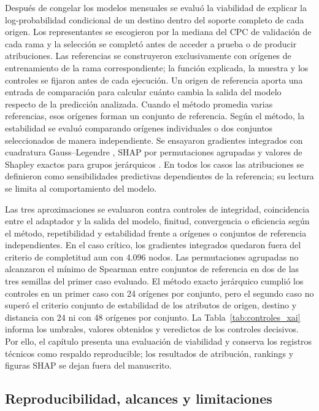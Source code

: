 Después de congelar los modelos mensuales se evaluó la viabilidad de explicar la log-probabilidad condicional de un destino dentro del soporte completo de cada origen. Los representantes se escogieron por la mediana del CPC de validación de cada rama y la selección se completó antes de acceder a prueba o de producir atribuciones. Las referencias se construyeron exclusivamente con orígenes de entrenamiento de la rama correspondiente; la función explicada, la muestra y los controles se fijaron antes de cada ejecución. Un origen de referencia aporta una entrada de comparación para calcular cuánto cambia la salida del modelo respecto de la predicción analizada. Cuando el método promedia varias referencias, esos orígenes forman un conjunto de referencia. Según el método, la estabilidad se evaluó comparando orígenes individuales o dos conjuntos seleccionados de manera independiente. Se ensayaron gradientes integrados con cuadratura Gauss--Legendre \cite{sundararajan2017axiomatic}, SHAP por permutaciones agrupadas y valores de Shapley exactos para grupos jerárquicos \cite{lundberg2017shap}. En todos los casos las atribuciones se definieron como sensibilidades predictivas dependientes de la referencia; su lectura se limita al comportamiento del modelo.

Las tres aproximaciones se evaluaron contra controles de integridad, coincidencia entre el adaptador y la salida del modelo, finitud, convergencia o eficiencia según el método, repetibilidad y estabilidad frente a orígenes o conjuntos de referencia independientes. En el caso crítico, los gradientes integrados quedaron fuera del criterio de completitud aun con 4.096 nodos. Las permutaciones agrupadas no alcanzaron el mínimo de Spearman entre conjuntos de referencia en dos de las tres semillas del primer caso evaluado. El método exacto jerárquico cumplió los controles en un primer caso con 24 orígenes por conjunto, pero el segundo caso no superó el criterio conjunto de estabilidad de los atributos de origen, destino y distancia con 24 ni con 48 orígenes por conjunto. La Tabla~\ref{tab:controles_xai} informa los umbrales, valores obtenidos y veredictos de los controles decisivos. Por ello, el capítulo presenta una evaluación de viabilidad y conserva los registros técnicos como respaldo reproducible; los resultados de atribución, rankings y figuras SHAP se dejan fuera del manuscrito.

\subsection{Reproducibilidad, alcances y limitaciones}
\label{sec:alcances}

